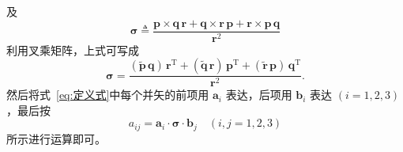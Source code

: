 及
\begin{equation}
    \bm{\sigma}\triangleq\frac{\mathbf{p}\times\mathbf{q}\,\mathbf{r}+\mathbf{q}\times\mathbf{r}\,\mathbf{p}+\mathbf{r}\times\mathbf{p}\,\mathbf{q}}{\mathbf{r}^{2}}
    \label{eq:定义式}
\end{equation}
利用叉乘矩阵，上式可写成
\begin{equation}
    \bm{\sigma}=\frac{(\tilde{\bm{p}}\,\mathbf{q})\,\mathbf{r}^{\mathrm{T}}+(\tilde{\bm{q}}\,\mathbf{r})\,\mathbf{p}^{\mathrm{T}}+(\tilde{\bm{r}}\,\mathbf{p})\,\mathbf{q}^{\mathrm{T}}}{\mathbf{r}^{2}}.
\end{equation}
然后将式~\eqref{eq:定义式}中每个并矢的前项用 $\mathbf{a}_i$ 表达，后项用 $\mathbf{b}_i$ 表达 $(i=1,2,3)$，最后按
\begin{equation}
    a_{ij}=\mathbf{a}_i\cdot\bm{\sigma}\cdot\mathbf{b}_j\quad(i,j=1,2,3)
    \label{eq:间接定向法:aij}
\end{equation}
所示进行运算即可。

